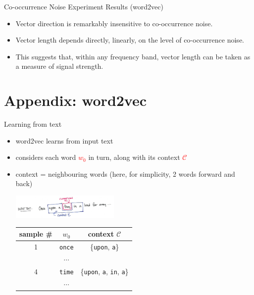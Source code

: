 \documentclass{beamer}
\newcommand{\word}[1]{\texttt{#1}}
\newcommand{\currentword}{{w_0}}
\newcommand{\context}{\mathcal{C}}
\begin{document}
\begin{frame}{Co-occurrence Noise Experiment Results (word2vec)}
	\begin{itemize}
		\item Vector direction is remarkably insensitive to co-occurrence noise.
		\item Vector length depends directly, linearly, on the level of co-occurrence noise.
		\item This suggests that, within any frequency band, vector length can be taken as a measure of signal strength.
	\end{itemize}
\end{frame}

\section{Appendix: word2vec}
\begin{frame}{Learning from text}
\begin{itemize}
\item word2vec learns from input text
\item considers each word \textcolor{red}{$\currentword$} in turn, along with its context \textcolor{red}{$\context$}
\item context = neighbouring words (here, for simplicity, 2 words forward and back)
\begin{center}
\includegraphics[height=45px]{context} \\
\vspace{0.5cm}
\begin{tabular}{c | c | c}
sample \# & $\currentword$ & context $\context$ \\ \hline
	1 & \word{once} & \{\word{upon}, \word{a}\} \\
 & $\cdots$ &  \\
4 & \word{time} & \{\word{upon}, \word{a}, \word{in}, \word{a}\} \\
 & $\cdots$ &  
\end{tabular}

\end{center}
\end{itemize}
\end{frame}
\end{document}
